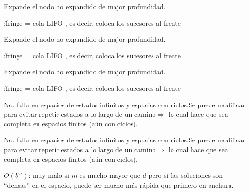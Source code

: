 \documentclass{article}
\begin{document}
\begin{huge}
Expande el nodo no expandido de major profundidad.

:\nl \v{fringe} = cola LIFO , es decir,
coloca los sucesores al frente

\textwidth
{}



Expande el nodo no expandido de major profundidad.

:\nl \v{fringe} = cola LIFO , es decir,
coloca los sucesores al frente

\textwidth
{}



Expande el nodo no expandido de major profundidad.

:\nl \v{fringe} = cola LIFO , es decir,
coloca los sucesores al frente

\textwidth {}





 No: falla en espacios de estados infinitos y espacios
con ciclos.\nl Se puede modificar para evitar repetir estados a lo
largo de un camino\nnl $\Rightarrow$ lo cual hace que sea completa
en espacios finitos (a{\'u}n con ciclos).



 No: falla en espacios de estados infinitos y espacios
con ciclos.\nl Se puede modificar para evitar repetir estados a lo
largo de un camino\nnl $\Rightarrow$ lo cual hace que sea completa
en espacios finitos (a{\'u}n con ciclos).

 $O(b^m)$: muy malo si $m$ es mucho mayor que $d$\nl
pero si las soluciones son ``densas'' en el espacio, puede ser
mucho m{\'a}s r{\'a}pida que primero en anchura.


\end{huge}
\end{document}
